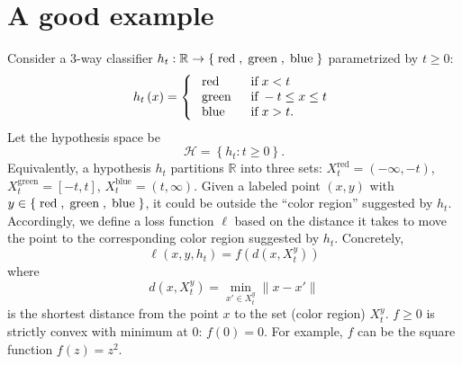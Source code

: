 \documentclass{article}
\def\H{\mathcal H}
\def\R{\mathbb R}
\begin{document}
\begin{figure}[H] \centering {} \label{fig:1dam}
\end{figure}

\section{A good example}
Consider a 3-way classifier $h_t: \R \to  \left\{\text{\;red\;}, \text{\;green\;}, \text{\;blue\;}\right\} $ parametrized by $t\ge 0$:
\begin{equation}
h_{t}\left(x\right) =\left\{ \begin{array}{ll}
\text{\;red\;}& \text{\;if\;} x < t  \\
\text{\;green\;}& \text{\;if\;} -t \leq  x \leq  t \\
\text{\;blue\;}& \text{\;if\;} x  > t. \\
\end{array}\right. 
\end{equation}
Let the hypothesis space be
\begin{equation}
\H = \left\{ h_t : t \geq  0\right\}.
\end{equation}
Equivalently, a hypothesis $h_t$ partitions $\R$ into three sets: 
$X^\text{red}_t = (-\infty, -t)$,
$X^\text{green}_t = [-t, t]$,
$X^\text{blue}_t = (t, \infty)$.
Given a labeled point $(x,y)$ with  $y \in \left\{\text{\;red\;}, \text{\;green\;}, \text{\;blue\;}\right\}$, it could be outside the ``color region'' suggested by $h_t$. 
Accordingly, we define a loss function $\ell$ based on the distance it takes to move the point to the corresponding color region suggested by $h_t$.
Concretely,
\begin{equation}
\ell\left(x, y, h_t\right) = f(d(x, X^y_t))
\end{equation}
where 
\begin{equation}
d(x, X^y_t) = \min_{x' \in X^y_t} \|x-x'\|
\end{equation}
is the shortest distance from the point $x$ to the set (color region) $X^y_t$.
$f \ge 0$ is strictly convex with minimum at 0: $f(0) = 0$.
For example, $f$ can be the square function $f(z)=z^2$.
\end{document}
